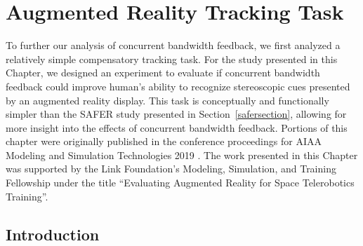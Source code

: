 \chapter{Augmented Reality Tracking Task}
\label{chap:3dtracking}

To further our analysis of concurrent bandwidth feedback, we first analyzed a relatively simple compensatory tracking task.
For the study presented in this Chapter, we designed an experiment to evaluate if concurrent bandwidth feedback could improve human's ability to recognize stereoscopic cues presented by an augmented reality display.
This task is conceptually and functionally simpler than the SAFER study presented in Section~\ref{safersection}, allowing for more insight into the effects of concurrent bandwidth feedback.
Portions of this chapter were originally published in the conference proceedings for AIAA Modeling and Simulation Technologies 2019 \citep{karasinski_evaluating_2019}.
The work presented in this Chapter was supported by the Link Foundation's Modeling, Simulation, and Training Fellowship under the title ``Evaluating Augmented Reality for Space Telerobotics Training''.

\section{Introduction}
